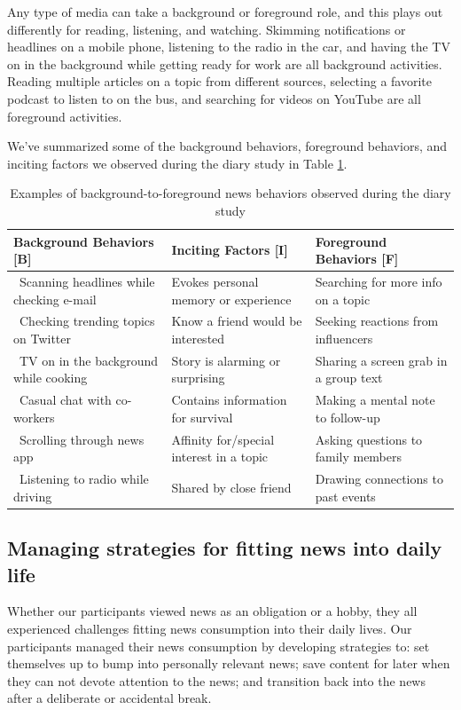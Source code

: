 \documentclass[sigchi]{acmart}
\begin{document}
Any type of media can take a background or foreground role, and this plays out differently for reading, listening, and watching. Skimming notifications or headlines on a mobile phone, listening to the radio in the car, and having the TV on in the background while getting ready for work are all background activities. Reading multiple articles on a topic from different sources, selecting a favorite podcast to listen to on the bus, and searching for videos on YouTube are all foreground activities. 

We've summarized some of the background behaviors, foreground behaviors, and inciting factors we observed during the diary study in Table \ref{tab:backgroundforeground}.

\begin{table}
  \caption{Examples of background-to-foreground news behaviors observed during the diary study}
  \label{tab:backgroundforeground}
  \begin{tabular}{p{5.5cm}p{5cm}p{5cm}}
    \toprule
    Background Behaviors [B]&Inciting Factors [I]&Foreground Behaviors [F]\\
    \midrule
    \ Scanning headlines while checking e-mail&Evokes personal memory or experience&Searching for more info on a topic\\
    \ Checking trending topics on Twitter&Know a friend would be interested&Seeking reactions from influencers\\
    \ TV on in the background while cooking&Story is alarming or surprising&Sharing a screen grab in a group text\\
    \ Casual chat with co-workers&Contains information for survival&Making a mental note to follow-up\\
    \ Scrolling through news app&Affinity for/special interest in a topic&Asking questions to family members\\
    \ Listening to radio while driving&Shared by close friend&Drawing connections to past events\\
\end{tabular}
\end{table}

\subsection{Managing strategies for fitting news into daily life}
Whether our participants viewed news as an obligation or a hobby, they all experienced challenges fitting news consumption into their daily lives. Our participants managed their news consumption by developing strategies to: set themselves up to bump into personally relevant news; save content for later when they can not devote attention to the news; and transition back into the news after a deliberate or accidental break.
\end{document}
